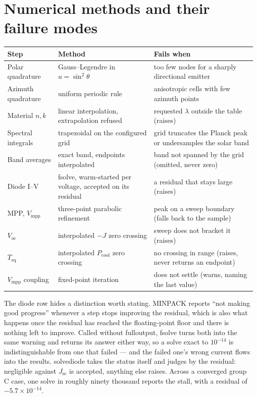 \documentclass[11pt,a4paper,twoside]{article}
\DeclareRobustCommand{\code}[1]{\begingroup\upshape\ttfamily
  \def\_{\allowbreak\textunderscore\allowbreak}#1\endgroup}
\begin{document}
\section{Numerical methods and their failure modes}
\label{sec:numerics}

\begin{table}[ht]
\centering
\small
\begin{tabular}{L{30mm}L{37mm}L{49mm}}
\toprule
Step & Method & Fails when\\
\midrule
Polar quadrature & Gauss--Legendre in \(u=\sin^2\theta\) &
too few nodes for a sharply directional emitter\\
Azimuth quadrature & uniform periodic rule &
anisotropic cells with few azimuth points\\
Material \(n,k\) & linear interpolation, extrapolation refused &
requested \(\lambda\) outside the table (raises)\\
Spectral integrals & trapezoidal on the configured grid &
grid truncates the Planck peak or undersamples the solar band\\
Band averages & exact band, endpoints interpolated &
band not spanned by the grid (omitted, never zero)\\
Diode I--V & \code{fsolve}, warm-started per voltage, accepted on its
residual & a residual that stays large (raises)\\
MPP, \(V_{\mathrm{mpp}}\) & three-point parabolic refinement &
peak on a sweep boundary (falls back to the sample)\\
\(V_{\mathrm{oc}}\) & interpolated \(-J\) zero crossing &
sweep does not bracket it (raises)\\
\(T_{\mathrm{eq}}\) & interpolated \(P_{\mathrm{cool}}\) zero crossing &
no crossing in range (raises, never returns an endpoint)\\
\(V_{\mathrm{mpp}}\) coupling & fixed-point iteration &
does not settle (warns, naming the last value)\\
\bottomrule
\end{tabular}
\end{table}

\begin{sloppypar}
The diode row hides a distinction worth stating. MINPACK reports ``not making
good progress'' whenever a step stops improving the residual, which is also
what happens once the residual has reached the floating-point floor and there
is nothing left to improve. Called without \code{full\_output}, \code{fsolve}
turns both into the same warning and returns its answer either way, so a solve
exact to \(10^{-14}\) is indistinguishable from one that failed --- and the
failed one's wrong current flows into the results. \code{\_solve\_diode} takes
the status itself and judges by the residual: negligible against
\(J_{\mathrm{sc}}\) is accepted, anything else raises. Across a converged group
C case, one solve in roughly ninety thousand reports the stall, with a residual
of \(-5.7\times10^{-14}\).
\end{sloppypar}
\end{document}
